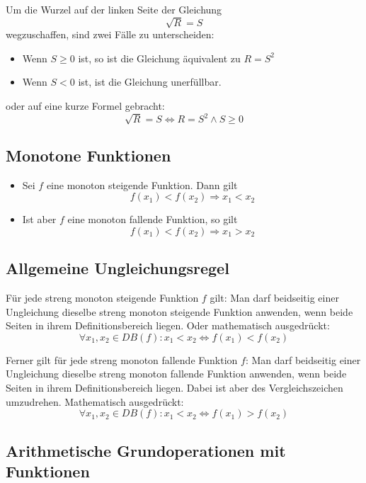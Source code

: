 \documentclass[10pt,a4paper]{article}
\begin{document}
Um die Wurzel auf der linken Seite der Gleichung
$$\sqrt{R} = S$$
wegzuschaffen, sind zwei Fälle zu unterscheiden:

\begin{itemize}
\item Wenn $S \geq 0$ ist, so ist die Gleichung äquivalent zu $R = S^2$
\item Wenn $S < 0$ ist, ist die Gleichung unerfüllbar.
\end{itemize}

oder auf eine kurze Formel gebracht:
$$\sqrt{R} = S \Leftrightarrow R = S^2 \wedge S \geq 0$$


\subsection{Monotone Funktionen}

\begin{itemize}
	\item Sei $f$ eine monoton steigende Funktion. Dann gilt
	$$f(x_1) < f(x_2) \Rightarrow x_1 < x_2$$

	\item Ist aber $f$ eine monoton fallende Funktion, so gilt
	$$f(x_1) < f(x_2) \Rightarrow x_1 > x_2$$
\end{itemize}


\subsection{Allgemeine Ungleichungsregel}

Für jede streng monoton steigende Funktion $f$ gilt: Man darf beidseitig einer Ungleichung dieselbe streng monoton steigende Funktion anwenden, wenn beide Seiten in ihrem Definitionsbereich liegen. Oder mathematisch ausgedrückt:
$$\forall x_1, x_2 \in DB(f): x_1 < x_2 \Leftrightarrow f(x_1) < f(x_2)$$

Ferner gilt für jede streng monoton fallende Funktion $f$: Man darf beidseitig einer Ungleichung dieselbe streng monoton fallende Funktion anwenden, wenn beide Seiten in ihrem Definitionsbereich liegen. Dabei ist aber des Vergleichszeichen umzudrehen. Mathematisch ausgedrückt:
$$\forall x_1, x_2 \in DB(f): x_1 < x_2 \Leftrightarrow f(x_1) > f(x_2)$$


\subsection{Arithmetische Grundoperationen mit Funktionen}
\end{document}
